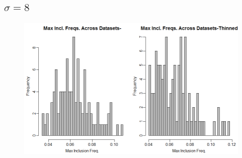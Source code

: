 \documentclass[12pt]{article}
\begin{document}
\subsection*{$\sigma=8$}
\begin{figure}[H]
\centerline{\includegraphics[scale=.47]{maxs_sq8}}
\end{figure}
\end{document}
